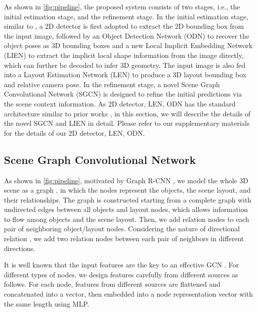 \documentclass[final]{cvpr}
\let\orgautoref\autoref
\renewcommand{\autoref}[1]{\def\figureautorefname{Fig.}\orgautoref{#1}}
\begin{document}
As shown in \autoref{fig:pipeline}, the proposed system consists of two stages, i.e., the initial estimation stage, and the refinement stage. In the initial estimation stage, similar to \cite{huang2018cooperative, nie2020total3dunderstanding}, a 2D detector is first adopted to extract the 2D bounding box from the input image, followed by an Object Detection Network (ODN) to recover the object poses as 3D bounding boxes and a new Local Implicit Embedding Network (LIEN) to extract the implicit local shape information from the image directly, which can further be decoded to infer 3D geometry.
The input image is also fed into a Layout Estimation Network (LEN) to produce a 3D layout bounding box and relative camera pose.
In the refinement stage, a novel Scene Graph Convolutional Network (SGCN) is designed to refine the initial predictions via the scene context information.
As 2D detector, LEN, ODN has the standard architecture similar to prior works \cite{huang2018cooperative, nie2020total3dunderstanding}, in this section, we will describe the details of the novel SGCN and LIEN in detail. Please refer to our supplementary materials for the details of our 2D detector, LEN, ODN.






\subsection{Scene Graph Convolutional Network}

As shown in \autoref{fig:pipeline}, motivated by Graph R-CNN \cite{yang2018graph}, we model the whole 3D scene as a graph , in which the nodes represent the objects, the scene layout, and their relationships.
The graph is constructed starting from a complete graph with undirected edges between all objects and layout nodes, which allows information to flow among objects and the scene layout. Then, we add relation nodes to each pair of neighboring object/layout nodes.
Considering the nature of directional relation \cite{krishna2017visual}, we add two relation nodes between each pair of neighbors in different directions. 




It is well known that the input features are the key to an effective GCN \cite{wang2018pixel2mesh}.
For different types of nodes, we design features carefully from different sources as follows.
For each node, features from different sources are flattened and concatenated into a vector, then embedded into a node representation vector with the same length using MLP. 
\end{document}
